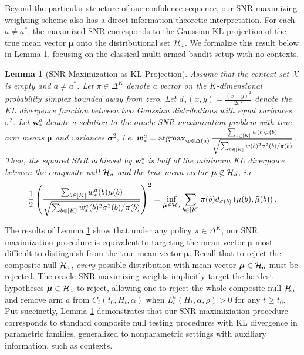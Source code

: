 \documentclass{article}
\newtheorem{lemma}{Lemma}
\begin{document}
Beyond the particular structure of our confidence sequence, our SNR-maximizing weighting scheme also has a direct information-theoretic interpretation. For each $a \neq a^*$, the maximized SNR corresponds to the Gaussian KL-projection of the true mean vector $\bm{\mu}$ onto the distributional set $\mathcal{H}_a$. We formalize this result below in Lemma \ref{lem:kl_projection}, focusing on the classical multi-armed bandit setup with no contexts.

\begin{lemma}[SNR Maximization as KL-Projection]\label{lem:kl_projection}
    Assume that the context set $\mathcal{X}$ is empty and $a \neq a^*$. Let $\pi \in \Delta^K$ denote a vector on the $K$-dimensional probability simplex bounded away from zero. Let $d_{\sigma}(x,y) = \frac{(x-y)^2}{2\sigma^2}$ denote the KL divergence function between two Gaussian distributions with equal variances $\sigma^2$. Let $\bm{w}_*^a$ denote a solution to the oracle SNR-maximization problem with true arm means $\bm{\mu}$ and variances $\bm\sigma^2$, i.e. $\bm{w}_*^a = \argmax_{\bm{w} \in \Delta(a)} \frac{\sum_{b \in [K]}w(b) \mu(b)}{\sqrt{\sum_{b \in [K]}w(b)^2 \sigma^2(b)/\pi(b)}}$. Then, the squared SNR achieved by $\bm{w}_*^a$ is half of the minimum KL divergence between the composite null $\mathcal{H}_a$ and the true mean vector $\boldsymbol{\mu} \not\in \mathcal{H}_a$, i.e. 
    \begin{equation}
        \frac{1}{2}\left( \frac{\sum_{b \in [K]}w_*^a(b) \mu(b)}{\sqrt{\sum_{b \in [K]} w_*^a(b)^2\sigma^2(b)/\pi(b)}}\right)^2 = \inf_{\tilde{\boldsymbol{\mu}} \in \mathcal{H}_a} \sum_{b \in [K]}\pi(b)  d_{\sigma(b)}\left(\mu(b), \tilde{\mu}(b)\right). 
    \end{equation}
\end{lemma}


The results of Lemma \ref{lem:kl_projection} show that under any policy $\pi \in \Delta^K$, our SNR maximization procedure is equivalent to targeting the mean vector $\tilde{\bm{\mu}}$ most difficult to distinguish from the true mean vector $\bm{\mu}$. Recall that to reject the composite null $\mathcal{H}_a$, \textit{every} possible distribution with mean vector $\tilde{\boldsymbol{\mu}} \in \mathcal{H}_a$ must be rejected. The oracle SNR-maximizing weights implicitly target the hardest hypotheses $\tilde{\boldsymbol\mu} \in \mathcal{H}_a$ to reject, allowing one to reject the whole composite null $\mathcal{H}_a$ and remove arm $a$ from $C_t(t_0, H_t, \alpha)$ when $L_t^a(H_t, \alpha, \rho) >0$ for any $t \geq t_0$. Put succinctly, Lemma \ref{lem:kl_projection} demonstrates that our SNR maximiziation procedure corresponds to standard composite null testing procedures with KL divergence in parametric families, generalized to nonparametric settings with auxiliary information, such as contexts. 
\end{document}
